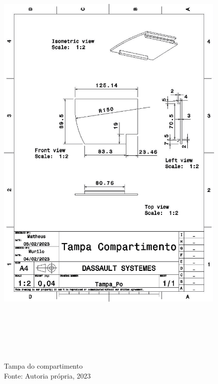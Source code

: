 \newpage
\pagebreak
\begin{figure}[h!]
\centering
\includegraphics[width=16cm,height=22cm]{figuras/Tampa_Compartimento.jpg}
\caption{Tampa do compartimento\\Fonte: Autoria própria, 2023}
\label{Tampa_Compartimento}
\end{figure}


 

